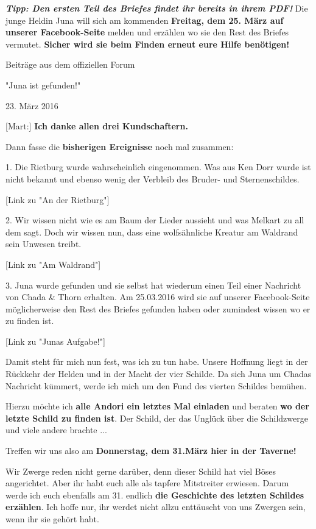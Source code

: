 \documentclass[10pt, a4paper, oneside]{book}
\begin{document}
\begin{multicols}{2}
\textbf{\textit{Tipp: Den ersten Teil des Briefes findet ihr bereits in ihrem PDF!}}
Die junge Heldin Juna will sich am kommenden \textbf{Freitag, dem 25. März auf unserer Facebook-Seite} melden und erzählen wo sie den Rest des Briefes vermutet. \textbf{Sicher wird sie beim Finden erneut eure Hilfe benötigen!}




\begin{center}
    Beiträge aus dem offiziellen Forum

    "Juna ist gefunden!"

    23. März 2016
\end{center}

[Mart:] \textbf{Ich danke allen drei Kundschaftern.}

Dann fasse die \textbf{bisherigen Ereignisse} noch mal zusammen:

1. Die Rietburg wurde wahrscheinlich eingenommen. Was aus Ken Dorr wurde ist nicht bekannt und ebenso wenig der Verbleib des Bruder- und Sternenschildes.

[Link zu "An der Rietburg"]


2. Wir wissen nicht wie es am Baum der Lieder aussieht und was Melkart zu all dem sagt. Doch wir wissen nun, dass eine wolfsähnliche Kreatur am Waldrand sein Unwesen treibt.

[Link zu "Am Waldrand"]

3. Juna wurde gefunden und sie selbst hat wiederum einen Teil einer Nachricht von Chada \& Thorn erhalten. Am 25.03.2016 wird sie auf unserer Facebook-Seite möglicherweise den Rest des Briefes gefunden haben oder zumindest wissen wo er zu finden ist.

[Link zu "Junas Aufgabe!"]

Damit steht für mich nun fest, was ich zu tun habe. Unsere Hoffnung liegt in der Rückkehr der Helden und in der Macht der vier Schilde. Da sich Juna um Chadas Nachricht kümmert, werde ich mich um den Fund des vierten Schildes bemühen.

Hierzu möchte ich \textbf{alle Andori ein letztes Mal einladen} und beraten \textbf{wo der letzte Schild zu finden ist}. Der Schild, der das Unglück über die Schildzwerge und viele andere brachte ...

Treffen wir uns also am \textbf{Donnerstag, dem 31.März hier in der Taverne!}

Wir Zwerge reden nicht gerne darüber, denn dieser Schild hat viel Böses angerichtet. Aber ihr habt euch alle als tapfere Mitstreiter erwiesen. Darum werde ich euch ebenfalls am 31. endlich \textbf{die Geschichte des letzten Schildes erzählen}. Ich hoffe nur, ihr werdet nicht allzu enttäuscht von uns Zwergen sein, wenn ihr sie gehört habt.


\end{multicols}
\end{document}
